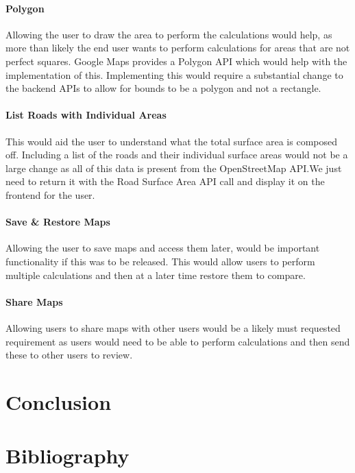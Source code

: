 \documentclass[a4paper,11pt]{article}
\begin{document}
\paragraph{Polygon} Allowing the user to draw the area to perform the
calculations would help, as more than likely the end user wants to perform
calculations for areas that are not perfect squares. Google Maps provides a
Polygon API which would help with the implementation of this. Implementing this
would require a substantial change to the backend APIs to allow for bounds to be
a polygon and not a rectangle.

\paragraph{List Roads with Individual Areas} This would aid the user to
understand what the total surface area is composed off. Including a list of the
roads and their individual surface areas would not be a large change as all of
this data is present from the OpenStreetMap API.\@ We just need to return it
with the Road Surface Area API call and display it on the frontend for the user.

\paragraph{Save \& Restore Maps} Allowing the user to save maps and access them
later, would be important functionality if this was to be released. This would
allow users to perform multiple calculations and then at a later time restore
them to compare.

\paragraph{Share Maps} Allowing users to share maps with other users would be a
likely must requested requirement as users would need to be able to perform
calculations and then send these to other users to review.

\section{Conclusion}


\section{Bibliography}

\printbibliography{}
\end{document}
